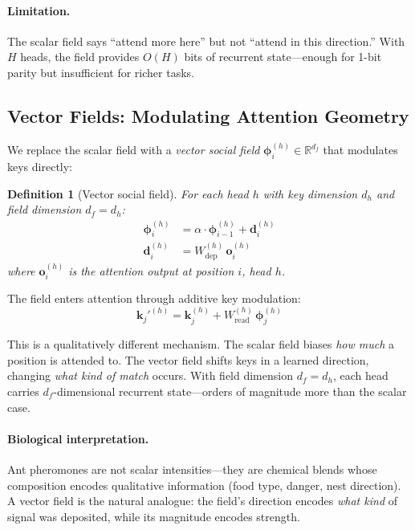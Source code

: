\documentclass[11pt,a4paper]{article}
\newcommand{\vfield}{\boldsymbol{\phi}}
\newcommand{\vdeposit}{\mathbf{d}}
\newcommand{\retain}{\alpha}
\newcommand{\R}{\mathbb{R}}
\newcommand{\K}{\mathbf{k}}
\newtheorem{definition}{Definition}
\begin{document}
\paragraph{Limitation.}  The scalar field says ``attend more here''
but not ``attend in this direction.''  With $H$ heads, the field
provides $O(H)$ bits of recurrent state---enough for 1-bit parity
but insufficient for richer tasks.

\subsection{Vector Fields: Modulating Attention Geometry}
\label{sec:vector-field}

We replace the scalar field with a \emph{vector social field}
$\vfield_i^{(h)} \in \R^{d_f}$ that modulates keys directly:

\begin{definition}[Vector social field]
For each head $h$ with key dimension $d_h$ and field dimension
$d_f = d_h$:
\begin{align}
  \vfield_i^{(h)} &= \retain \cdot \vfield_{i-1}^{(h)}
    + \vdeposit_i^{(h)}
    \label{eq:vector-recurrence} \\
  \vdeposit_i^{(h)} &= W_{\mathrm{dep}}^{(h)} \, \mathbf{o}_i^{(h)}
    \label{eq:vector-deposit}
\end{align}
where $\mathbf{o}_i^{(h)}$ is the attention output at position $i$,
head $h$.
\end{definition}

The field enters attention through additive key modulation:
\begin{equation}
  \K_j'^{(h)} = \K_j^{(h)} + W_{\mathrm{read}}^{(h)} \, \vfield_j^{(h)}
  \label{eq:key-modulation}
\end{equation}

This is a qualitatively different mechanism.  The scalar field biases
\emph{how much} a position is attended to.  The vector field shifts
keys in a learned direction, changing \emph{what kind of match}
occurs.  With field dimension $d_f = d_h$, each head carries
$d_f$-dimensional recurrent state---orders of magnitude more than the
scalar case.

\paragraph{Biological interpretation.}  Ant pheromones are not scalar
intensities---they are chemical blends whose composition encodes
qualitative information (food type, danger, nest direction).  A vector
field is the natural analogue: the field's direction encodes
\emph{what kind} of signal was deposited, while its magnitude encodes
strength.
\end{document}
